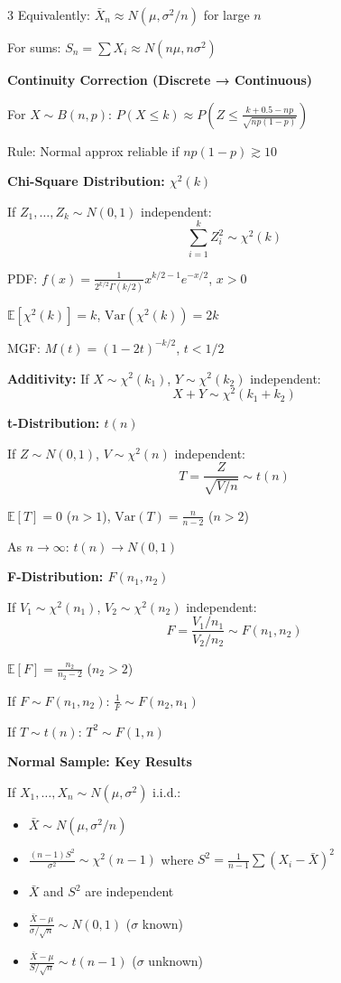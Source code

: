 \documentclass[10pt,letterpaper]{article}
\newcommand{\Var}{\text{Var}}
\newcommand{\E}{\mathbb{E}}
\begin{document}
\begin{multicols}{3}
Equivalently: $\bar{X}_n \approx N(\mu, \sigma^2/n)$ for large $n$

For sums: $S_n = \sum X_i \approx N(n\mu, n\sigma^2)$

\textbf{Continuity Correction (Discrete → Continuous)}

For $X \sim B(n,p)$: $P(X \le k) \approx P\left(Z \le \frac{k+0.5-np}{\sqrt{np(1-p)}}\right)$

Rule: Normal approx reliable if $np(1-p) \gtrsim 10$

\textbf{Chi-Square Distribution: $\chi^2(k)$}

If $Z_1, \ldots, Z_k \sim N(0,1)$ independent:
$$\sum_{i=1}^k Z_i^2 \sim \chi^2(k)$$

PDF: $f(x) = \frac{1}{2^{k/2}\Gamma(k/2)} x^{k/2-1} e^{-x/2}$, $x > 0$

$\E[\chi^2(k)] = k$, $\Var(\chi^2(k)) = 2k$

MGF: $M(t) = (1-2t)^{-k/2}$, $t < 1/2$

\textbf{Additivity:} If $X \sim \chi^2(k_1)$, $Y \sim \chi^2(k_2)$ independent:
$$X + Y \sim \chi^2(k_1 + k_2)$$

\textbf{t-Distribution: $t(n)$}

If $Z \sim N(0,1)$, $V \sim \chi^2(n)$ independent:
$$T = \frac{Z}{\sqrt{V/n}} \sim t(n)$$

$\E[T] = 0$ ($n > 1$), $\Var(T) = \frac{n}{n-2}$ ($n > 2$)

As $n \to \infty$: $t(n) \to N(0,1)$

\textbf{F-Distribution: $F(n_1, n_2)$}

If $V_1 \sim \chi^2(n_1)$, $V_2 \sim \chi^2(n_2)$ independent:
$$F = \frac{V_1/n_1}{V_2/n_2} \sim F(n_1, n_2)$$

$\E[F] = \frac{n_2}{n_2-2}$ ($n_2 > 2$)

If $F \sim F(n_1, n_2)$: $\frac{1}{F} \sim F(n_2, n_1)$

If $T \sim t(n)$: $T^2 \sim F(1, n)$

\textbf{Normal Sample: Key Results}

If $X_1, \ldots, X_n \sim N(\mu, \sigma^2)$ i.i.d.:
\begin{itemize}
\item $\bar{X} \sim N(\mu, \sigma^2/n)$
\item $\frac{(n-1)S^2}{\sigma^2} \sim \chi^2(n-1)$ where $S^2 = \frac{1}{n-1}\sum(X_i-\bar{X})^2$
\item $\bar{X}$ and $S^2$ are independent
\item $\frac{\bar{X}-\mu}{\sigma/\sqrt{n}} \sim N(0,1)$ ($\sigma$ known)
\item $\frac{\bar{X}-\mu}{S/\sqrt{n}} \sim t(n-1)$ ($\sigma$ unknown)
\end{itemize}


\end{multicols}
\end{document}
